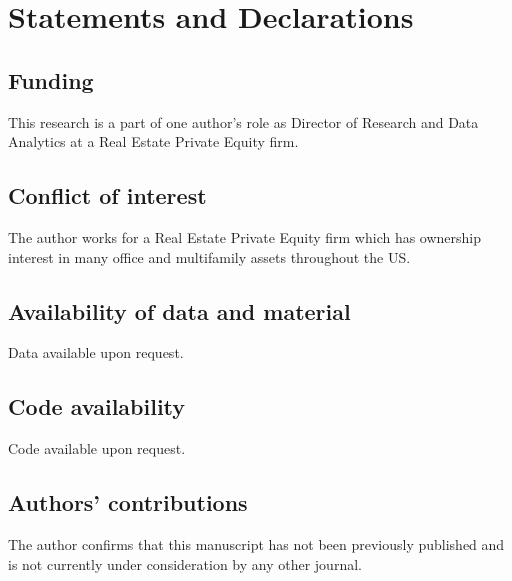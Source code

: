\pagebreak
%
\section*{Statements and Declarations}
\subsection{Funding}
This research is a part of one author's role as Director of Research and Data Analytics at a Real Estate Private Equity firm. 

\subsection{Conflict of interest}
The author works for a Real Estate Private Equity firm which has ownership interest in many office and multifamily assets throughout the US. 

\subsection{Availability of data and material}
Data available upon request.

\subsection{Code availability}
Code available upon request.

\subsection{Authors' contributions}
The author confirms that this manuscript has not been previously published and is not currently under consideration by any other journal.




%
%
\pagebreak
 



